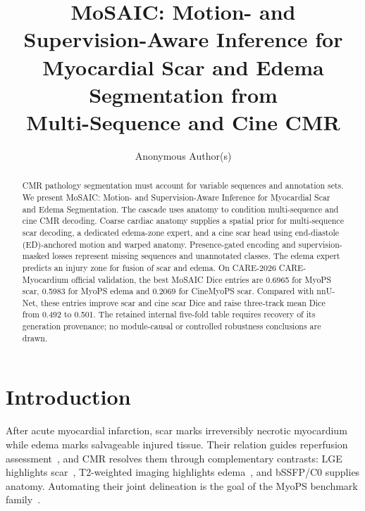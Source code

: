 \documentclass[runningheads]{llncs}
\begin{document}
\title{MoSAIC: Motion- and Supervision-Aware Inference for\\
Myocardial Scar and Edema Segmentation from\\
Multi-Sequence and Cine CMR}

\author{Anonymous Author(s)}

\maketitle

\begin{abstract}
CMR pathology segmentation must account for variable sequences and
annotation sets. We present MoSAIC: Motion- and Super\-vision-Aware
Inference for Myocardial Scar and Edema Segmentation. The cascade uses
anatomy to condition multi-sequence and cine CMR decoding. Coarse cardiac anatomy supplies a spatial prior
for multi-sequence scar decoding, a dedicated edema-zone expert, and a cine
scar head using end-diastole (ED)-anchored motion and warped anatomy. Presence-gated encoding
and supervision-masked losses represent missing sequences and unannotated
classes. The edema expert predicts an injury zone for fusion of scar and edema.
On CARE-2026 CARE-Myo\-cardium official validation, the best MoSAIC Dice entries
are 0.6965 for MyoPS scar, 0.5983 for MyoPS edema and 0.2069 for CineMyoPS scar.
Compared with nnU-Net, these entries improve scar and cine scar Dice and raise
three-track mean Dice from 0.492 to 0.501. The retained internal five-fold table
requires recovery of its generation provenance; no module-causal or controlled
robustness conclusions are drawn.

\end{abstract}

\section{Introduction}

After acute myocardial infarction, scar marks irreversibly necrotic myocardium
while edema marks salvageable injured tissue. Their relation
guides reperfusion assessment~\cite{eitel2011cardiac,ibanez2015evolving}, and
CMR resolves them through complementary contrasts: LGE highlights
scar~\cite{kim1999relationship}, T2-weighted imaging highlights
edema~\cite{abdelaty2004delayed}, and bSSFP/C0 supplies anatomy. Automating
their joint delineation is the goal of the MyoPS benchmark
family~\cite{li2023myops,zhuang2019multivariate}.
\end{document}

